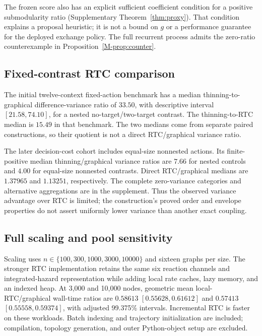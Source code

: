\documentclass[preprint,11pt,sort&compress]{elsarticle}
\begin{document}
The frozen score also has an explicit sufficient coefficient condition for a positive submodularity ratio (Supplementary Theorem~\ref{thm:proxy}). That condition explains a proposal heuristic; it is not a bound on $g$ or a performance guarantee for the deployed exchange policy. The full recurrent process admits the zero-ratio counterexample in Proposition~\ref{M-prop:counter}.


\subsection{Fixed-contrast RTC comparison}\label{sec:variance_details}

The initial twelve-context fixed-action benchmark has a median thinning-to-graphical difference-variance ratio of $33.50$, with descriptive interval $[21.58,74.10]$, for a nested no-target/two-target contrast. The thinning-to-RTC median is $15.49$ in that benchmark. The two medians come from separate paired constructions, so their quotient is not a direct RTC/graphical variance ratio.

The later decision-cost cohort includes equal-size nonnested actions. Its finite-positive median thinning/graphical variance ratios are $7.66$ for nested controls and $4.00$ for equal-size nonnested contrasts. Direct RTC/graphical medians are $1.37965$ and $1.13251$, respectively. The complete zero-variance categories and alternative aggregations are in the supplement. Thus the observed variance advantage over RTC is limited; the construction's proved order and envelope properties do not assert uniformly lower variance than another exact coupling.


\subsection{Full scaling and pool sensitivity}\label{sec:scaling_details}

Scaling uses $n\in\{100,300,1000,3000,10000\}$ and sixteen graphs per size. The stronger RTC implementation retains the same six reaction channels and integrated-hazard representation while adding local rate caches, lazy memory, and an indexed heap. At 3,000 and 10,000 nodes, geometric mean local-RTC/graphical wall-time ratios are $0.58613$ $[0.55628,0.61612]$ and $0.57413$ $[0.55558,0.59374]$, with adjusted 99.375\% intervals. Incremental RTC is faster on these workloads. Batch indexing and trajectory initialization are included; compilation, topology generation, and outer Python-object setup are excluded.
\end{document}
